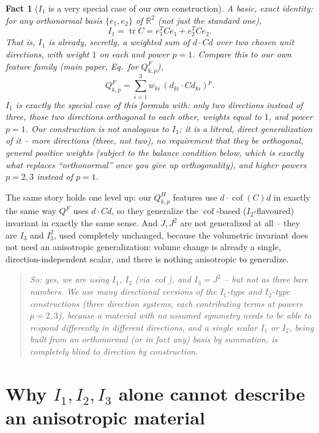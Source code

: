 \documentclass[11pt,a4paper]{article}
\newtheorem{fact}{Fact}
\newcommand{\Cof}{\operatorname{cof}}
\newcommand{\tr}{\operatorname{tr}}
\newcommand{\R}{\mathbb{R}}
\newenvironment{takeaway}
 {\begin{quote}\small\itshape\color{blue!60!black}}
 {\end{quote}}
\begin{document}
\begin{fact}[$I_1$ is a very special case of our own construction]
\label{fact:i1-special-case}
A basic, exact identity: for \emph{any} orthonormal basis
$\{e_1,e_2\}$ of $\R^2$ (not just the standard one),
\[
 I_1=\tr C = e_1^TCe_1+e_2^TCe_2 .
\]
That is, $I_1$ is \emph{already}, secretly, a weighted sum of
$d\cdot Cd$ over two chosen unit directions, with weight $1$ on each
and power $p=1$. Compare this to our own feature family (main paper,
Eq.~for $Q^F_{k,p}$),
\[
 Q_{k,p}^F=\sum_{i=1}^3 w_{ki}\,(d_{ki}\cdot Cd_{ki})^p .
\]
$I_1$ is exactly the special case of this formula with: only
\emph{two} directions instead of three, those two directions
\emph{orthogonal} to each other, weights \emph{equal to} $1$, and power
$p=1$. Our construction is not analogous to $I_1$; it is a literal,
direct generalization of it -- more directions (three, not two), no
requirement that they be orthogonal, general positive weights (subject
to the balance condition below, which is exactly what replaces
``orthonormal'' once you give up orthogonality), and higher powers
$p=2,3$ instead of $p=1$.
\end{fact}

The same story holds one level up: our $Q_{k,p}^H$ features use
$d\cdot\Cof(C)d$ in exactly the same way $Q^F$ uses $d\cdot Cd$, so
they generalize the $\Cof$-based ($I_2$-flavoured) invariant in exactly
the same sense. And $J,J^2$ are not generalized at all -- they are
$I_3$ and $I_3^2$, used completely unchanged, because the volumetric
invariant does not need an anisotropic generalization: volume change is
already a single, direction-independent scalar, and there is nothing
anisotropic to generalize.

\begin{takeaway}
So: yes, we are using $I_1$, $I_2$ (via $\Cof$), and $I_3=J^2$ -- but
not as three bare numbers. We use \emph{many} directional versions of
the $I_1$-type and $I_2$-type constructions (three direction systems,
each contributing terms at powers $p=2,3$), because a material with
\emph{no assumed symmetry} needs to be able to respond differently in
different directions, and a single scalar $I_1$ or $I_2$, being built
from an orthonormal (or in fact \emph{any}) basis by summation, is
completely blind to direction by construction.
\end{takeaway}

\section{Why $I_1,I_2,I_3$ alone cannot describe an anisotropic material}
\label{sec:isotropy-blindness}
\end{document}

